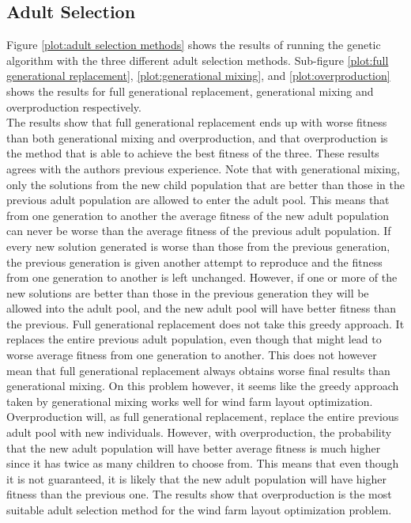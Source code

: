 \subsection{Adult Selection}
Figure \ref{plot:adult selection methods} shows the results of running the genetic algorithm with the three different adult selection methods. Sub-figure \ref{plot:full generational replacement}, \ref{plot:generational mixing}, and \ref{plot:overproduction} shows the results for full generational replacement, generational mixing and overproduction respectively. \\

\noindent The results show that full generational replacement ends up with worse fitness than both generational mixing and overproduction, and that overproduction is the method that is able to achieve the best fitness of the three. These results agrees with the authors previous experience. Note that with generational mixing, only the solutions from the new child population that are better than those in the previous adult population are allowed to enter the adult pool. This means that from one generation to another the average fitness of the new adult population can never be worse than the average fitness of the previous adult population. If every new solution generated is worse than those from the previous generation, the previous generation is given another attempt to reproduce and the fitness from one generation to another is left unchanged. However, if one or more of the new solutions are better than those in the previous generation they will be allowed into the adult pool, and the new adult pool will have better fitness than the previous. Full generational replacement does not take this greedy approach. It replaces the entire previous adult population, even though that might lead to worse average fitness from one generation to another. This does not however mean that full generational replacement always obtains worse final results than generational mixing. On this problem however, it seems like the greedy approach taken by generational mixing works well for wind farm layout optimization. Overproduction will, as full generational replacement, replace the entire previous adult pool with new individuals. However, with overproduction, the probability that the new adult population will have better average fitness is much higher since it has twice as many children to choose from. This means that even though it is not guaranteed, it is likely that the new adult population will have higher fitness than the previous one. The results show that overproduction is the most suitable adult selection method for the wind farm layout optimization problem.\\

